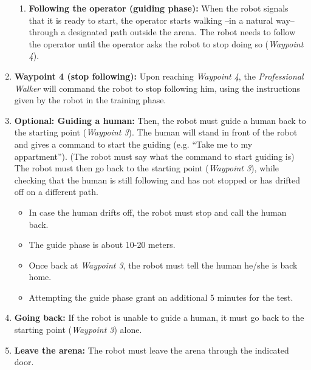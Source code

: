 \begin{enumerate}
\begin{enumerate}
	\item \textbf{Following the operator (guiding phase):} 
	When the robot signals that it is ready to start, the operator starts walking --in a natural way-- through a designated path outside the arena. 
	The robot needs to follow the operator until the operator asks the robot to stop doing so (\textit{Waypoint 4}).
	\end{enumerate}

	\item \textbf{Waypoint 4 (stop following):} Upon reaching \textit{Waypoint 4}, 
	  the \textit{Professional Walker} will command the robot to stop following him, using the instructions given by the robot in the training phase.
	
	\item \textbf{Optional: Guiding a human:} Then, the robot must guide a human back to the starting point (\textit{Waypoint 3}).
	The human will stand in front of the robot and gives a command to start the guiding (e.g. ``Take me to my appartment'').
	(The robot must say what the command to start guiding is)
	The robot must then go back to the starting point (\textit{Waypoint 3}), while checking that the human is still following and has not stopped or has drifted off on a different path.
	
	\begin{itemize}
	 \item In case the human drifts off, the robot must stop and call the human back. 
	 \item The guide phase is about 10-20 meters.
	 \item Once back at \textit{Waypoint 3}, the robot must tell the human he/she is back home. 
	 \item Attempting the guide phase grant an additional 5 minutes for the test. 
	\end{itemize}
	
	\item \textbf{Going back:} If the robot is unable to guide a human, it must go back to the starting point (\textit{Waypoint 3}) alone. 
	
	\item \textbf{Leave the arena:} The robot must leave the arena through the indicated door.
\end{enumerate}

